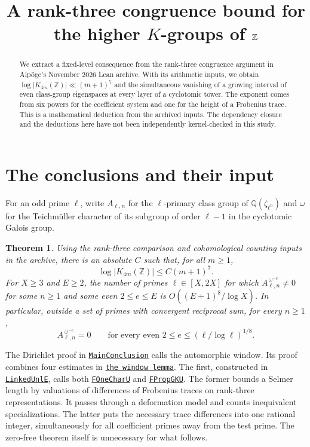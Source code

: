 \documentclass[11pt]{article}
\title{A rank-three congruence bound for the higher \(K\)-groups of \(\Z\)}
\date{}
\author{}
\newtheorem{theorem}{Theorem}
\newcommand{\Z}{\mathbb Z}
\newcommand{\Q}{\mathbb Q}
\newcommand{\avref}[2]{\href{run:lean/src/Development/AutomorphicArithmetic/AutomorphicVarieties/#1.lean}{\texttt{#2}}}
\newcommand{\denseref}[2]{\avref{ModularityArgument/ThresholdArguments/DenseThresholdCases/#1}{#2}}
\begin{document}
\maketitle
\vspace{-3.8em}

\begin{abstract}
We extract a fixed-level consequence from the rank-three congruence argument in
Alp\"oge's November 2026 Lean archive. With its arithmetic inputs, we obtain
$\log |K_{4m}(\Z)|\ll(m+1)^7$ and the simultaneous vanishing of a growing
interval of even class-group eigenspaces at every layer of a cyclotomic tower.
The exponent comes from six powers for the coefficient system and one for
the height of a Frobenius trace. This is a mathematical deduction from the
archived inputs. The dependency closure and the deductions here have not
been independently kernel-checked in this study.
\end{abstract}

\section{The conclusions and their input}
For an odd prime $\ell$, write $A_{\ell,n}$ for the $\ell$-primary class group of $\Q(\zeta_{\ell^n})$
and $\omega$ for the Teichm\"uller character of its subgroup of order $\ell-1$
in the cyclotomic Galois group.

\begin{theorem}\label{main}
Using the rank-three comparison and cohomological counting inputs in the
archive, there is an absolute $C$ such that, for all $m\ge1$,
\[
                 \log |K_{4m}(\Z)|\le C(m+1)^7.
\]
For $X\ge3$ and $E\ge2$, the number of primes $\ell\in[X,2X]$ for which
$A_{\ell,n}^{\,\omega^{-e}}\ne0$ for some $n\ge1$ and some even
$2\le e\le E$ is $O((E+1)^8/\log X)$. In particular, outside a set
of primes with convergent reciprocal sum, for every $n\ge1$,
\[
 A_{\ell,n}^{\,\omega^{-e}}=0\qquad
 \text{for every even }2\le e\le(\ell/\log\ell)^{1/8}.
\]
\end{theorem}

The Dirichlet proof in
\href{run:lean/src/Development/AutomorphicArithmetic/CharacterBoxes/MainConclusion.lean}{\texttt{MainConclusion}}
calls the automorphic window. Its proof combines four estimates in
\denseref{WindowBoundOfLiteratureLevel}{the window lemma}. The first, constructed in
\denseref{LinkedUnlE}{LinkedUnlE}, calls both
\denseref{FOneCharU}{FOneCharU} and \denseref{FPropGKU}{FPropGKU}.
The former bounds a Selmer length by valuations of differences of Frobenius
traces on rank-three representations. It passes through a deformation model
and counts inequivalent specializations. The latter puts the necessary
trace differences into one rational integer, simultaneously for all
coefficient primes away from the test prime. The zero-free theorem itself
is unnecessary for what follows.
\end{document}
